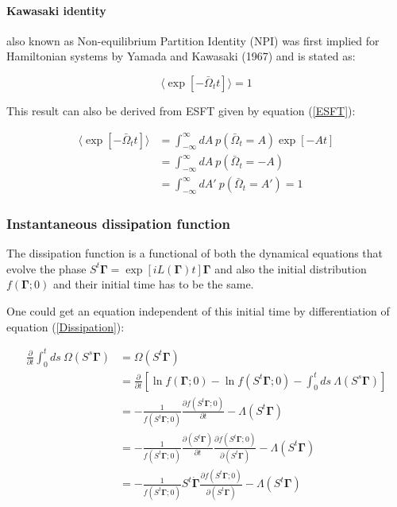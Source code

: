 \documentclass[a4paper,12pt,nofootinbib]{article}
\begin{document}
\paragraph{Kawasaki identity}

also known as Non-equilibrium Partition Identity (NPI) was first implied for Hamiltonian systems by Yamada and Kawasaki (1967) \cite{Anonymous:1967fr} and is stated as:

\begin{equation}
  \langle \exp[-\bar{\Omega}_t t] \rangle =1
\end{equation}

This result can also be derived from ESFT given by equation (\ref{ESFT}):

\begin{equation}
\begin{aligned}
  \langle \exp[-\bar{\Omega}_t t] \rangle &= \int_{-\infty}^{\infty} dA\ p(\bar{\Omega}_t=A)\exp[-A t]\\
  &=\int_{-\infty}^{\infty} dA\ p(\bar{\Omega}_t=-A)\\
  &=\int_{-\infty}^{\infty} dA'\ p(\bar{\Omega}_t=A')=1
\end{aligned}
\end{equation}


\subsubsection{Instantaneous dissipation function}

The dissipation function is a functional of both the dynamical equations that evolve the phase $S^t \bm{\Gamma} = \exp[iL(\bm{\Gamma})t]\bm{\Gamma}$ and also the initial distribution $f(\bm{\Gamma};0)$ and their initial time has to be the same.

One could get an equation independent of this initial time by differentiation of equation (\ref{Dissipation}):

\begin{equation}
\begin{aligned}
  \frac{\partial}{\partial t}\int_0^t ds\ \Omega(S^s  \bm{\Gamma}) &= \Omega(S^t \bm{\Gamma})\\
  &=\frac{\partial}{\partial t}[\ln{f(\bm{\Gamma};0)}-\ln{f(S^t\bm{\Gamma};0)}
-\int_0^t ds \ \Lambda(S^s \bm{\Gamma})
]\\
&=-\frac{1}{f(S^t\bm{\Gamma};0)}\frac{\partial f(S^t\bm{\Gamma};0)}{\partial t}-\Lambda(S^t \bm{\Gamma})\\
&=-\frac{1}{f(S^t\bm{\Gamma};0)}\frac{\partial( S^t \bm{\Gamma})}{\partial t}\frac{\partial f(S^t\bm{\Gamma};0)}{\partial(S^t \bm{\Gamma})}-\Lambda(S^t \bm{\Gamma})\\
&=-\frac{1}{f(S^t\bm{\Gamma};0)}S^t\dot{\bm{\Gamma}}
\frac{\partial f(S^t\bm{\Gamma};0)}{\partial(S^t \bm{\Gamma})}-\Lambda(S^t \bm{\Gamma})
\end{aligned}
\end{equation}
\end{document}

